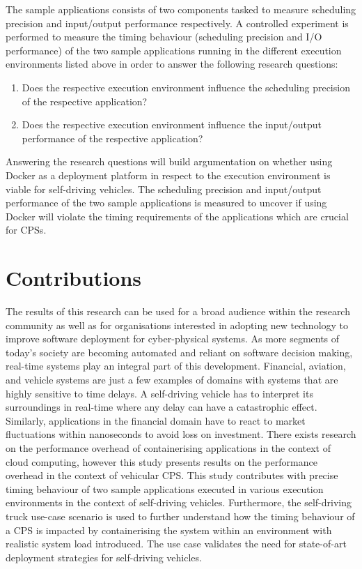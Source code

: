The sample applications consists of two components tasked to measure scheduling precision and input/output performance respectively. 
A controlled experiment is performed to measure the timing behaviour (scheduling precision and I/O performance) of the two sample applications running in the different execution environments listed above in order to answer the following research questions:\\
\begin{enumerate}[label=\textbf{RQ\arabic*}]
\label{section:rqs}
	\item Does the respective execution environment influence the scheduling precision of the respective application?
	\item Does the respective execution environment influence the input/output performance of the respective application?\\
\end{enumerate}

Answering the research questions will build argumentation on whether using Docker as a deployment platform in respect to the execution environment is viable for self-driving vehicles. The scheduling precision and input/output performance of the two sample applications is measured to uncover if using Docker will violate the timing requirements of the applications which are crucial for CPSs.



\section{Contributions}

The results of this research can be used for a broad audience within the research community as well as for organisations interested in adopting new technology to improve software deployment for cyber-physical systems. As more segments of today’s society are becoming automated and reliant on software decision making, real-time systems play an integral part of this development. Financial, aviation, and vehicle systems are just a few examples of domains with systems that are highly sensitive to time delays. A self-driving vehicle has to interpret its surroundings in real-time where any delay can have a catastrophic effect. Similarly, applications in the financial domain have to react to market fluctuations within nanoseconds to avoid loss on investment. There exists research on the performance overhead of containerising applications in the context of cloud computing, however this study presents results on the performance overhead in the context of vehicular CPS. This study contributes with precise timing behaviour of two sample applications executed in various execution environments in the context of self-driving vehicles. Furthermore, the self-driving truck use-case scenario is used to further understand how the timing behaviour of a CPS is impacted by containerising the system within an environment with realistic system load introduced. The use case validates the need for state-of-art deployment strategies for self-driving vehicles. 
